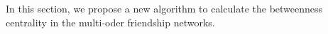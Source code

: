 In this section, we propose a new algorithm to calculate the betweenness centrality in the multi-oder friendship
networks.

